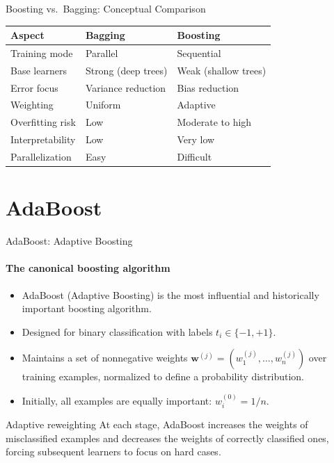 \begin{frame}{Boosting vs.\ Bagging: Conceptual Comparison}
  \renewcommand{\arraystretch}{1.5}
  \begin{center}
  \begin{tabular}{lll}
    \toprule
    \textbf{Aspect} & \textbf{Bagging} & \textbf{Boosting} \\
    \midrule
    Training mode & Parallel & Sequential \\
    Base learners & Strong (deep trees) & Weak (shallow trees) \\
    Error focus & Variance reduction & Bias reduction \\
    Weighting & Uniform & Adaptive \\
    Overfitting risk & Low & Moderate to high \\
    Interpretability & Low & Very low \\
    Parallelization & Easy & Difficult \\
    \bottomrule
  \end{tabular}
  \end{center}
\end{frame}

\section{AdaBoost}

\begin{frame}{AdaBoost: Adaptive Boosting}
  \framesubtitle{The canonical boosting algorithm}
  \begin{itemize}
    \item \alert{AdaBoost} (Adaptive Boosting) is the most influential and historically
          important boosting algorithm.
    \item Designed for \alert{binary classification} with labels $t_i \in \{-1, +1\}$.
    \item Maintains a set of nonnegative weights $\mathbf{w}^{(j)} = (w_1^{(j)}, \ldots, w_n^{(j)})$
          over training examples, normalized to define a probability distribution.
    \item Initially, all examples are equally important: $w_i^{(0)} = 1/n$.
  \end{itemize}
  \begin{block}{Adaptive reweighting}
    At each stage, AdaBoost increases the weights of \alert{misclassified examples} and
    decreases the weights of correctly classified ones, forcing subsequent learners to
    focus on hard cases.
  \end{block}
\end{frame}

